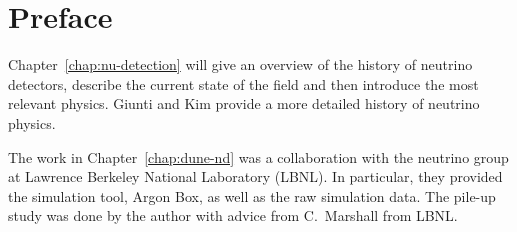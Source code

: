 \renewcommand{\Chapter}{{Preface}}
\chapter*{\Chapter}
\chaptermark{\Chapter}

Chapter~\ref{chap:nu-detection} will give an overview of the history of neutrino detectors, describe the current state of the field and then introduce the most relevant physics.
Giunti and Kim provide a more detailed history of neutrino physics.~\cite{giunti}

The work in Chapter~\ref{chap:dune-nd} was a collaboration with the neutrino group at Lawrence Berkeley National Laboratory (LBNL).
In particular, they provided the simulation tool, Argon Box, as well as the raw simulation data.
The \Pgpz pile-up study was done by the author with advice from C.\ Marshall from LBNL.